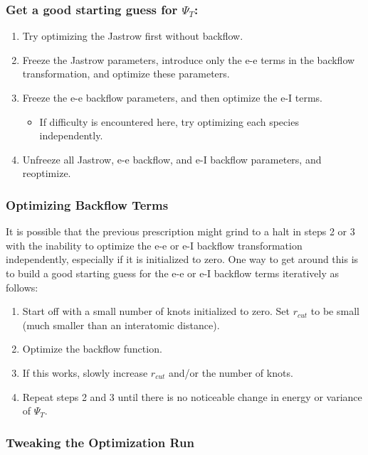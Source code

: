 \subsubsection{Get a good starting guess for $\Psi_T$:}

\begin{enumerate}
\item Try optimizing the Jastrow first without backflow.
\item Freeze the Jastrow parameters, introduce only the e-e terms in the backflow transformation, and optimize these parameters.
\item Freeze the e-e backflow parameters, and then optimize the e-I terms.
  \begin{itemize}
    \item If difficulty is encountered here, try optimizing each species independently.
  \end{itemize}
\item Unfreeze all Jastrow, e-e backflow, and e-I backflow parameters, and reoptimize.  

\end{enumerate}


\subsubsection{Optimizing Backflow Terms}

It is possible that the previous prescription might grind to a halt in steps 2 or 3 with the inability to optimize the e-e or e-I backflow transformation independently, especially if it is initialized to zero.  One way to get around this is to build a good starting guess for the e-e or e-I backflow terms iteratively as follows:  

\begin{enumerate}
\item Start off with a small number of knots initialized to zero.  Set $r_{cut}$ to be small (much smaller than an interatomic distance).
\item Optimize the backflow function.
\item If this works, slowly increase $r_{cut}$ and/or the number of knots.
\item Repeat steps 2 and 3 until there is no noticeable change in energy or variance of $\Psi_T$.
\end{enumerate}

\subsubsection{Tweaking the Optimization Run}

